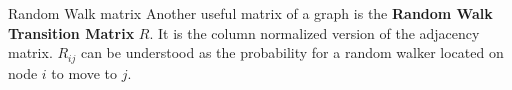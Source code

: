 




\begin{textbox}{Random Walk matrix}
  Another useful matrix of a graph is the \textbf{Random Walk Transition Matrix} $R$. It is the column normalized version of the adjacency matrix. $R_{ij}$ can be understood as the probability for a random walker located on node $i$ to move to $j$.
\end{textbox}


